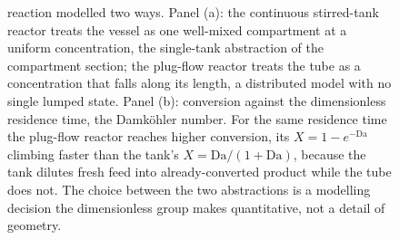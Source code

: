 \begin{figure}[htbp]
{reaction modelled two ways. Panel (a): the continuous stirred-tank reactor
treats the vessel as one well-mixed compartment at a uniform concentration,
the single-tank abstraction of the compartment section; the plug-flow
reactor treats the tube as a concentration that falls along its length, a
distributed model with no single lumped state. Panel (b): conversion
against the dimensionless residence time, the Damk\"ohler number. For the
same residence time the plug-flow reactor reaches higher conversion, its
$X = 1 - e^{-\mathrm{Da}}$ climbing faster than the tank's
$X = \mathrm{Da}/(1+\mathrm{Da})$, because the tank dilutes fresh feed into
already-converted product while the tube does not. The choice between the
two abstractions is a modelling decision the dimensionless group makes
quantitative, not a detail of geometry.}
\label{fig:vol02ch18:reactor-abstraction}
\end{figure}
